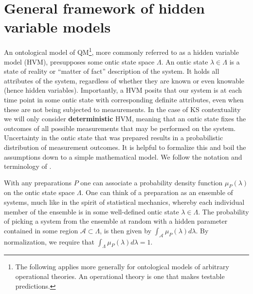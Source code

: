 \section{General framework of hidden variable models}
\label{sec:hvm}
An ontological model of QM\footnote{The following applies more generally for ontological models of arbitrary operational theories. An operational theory is one that makes testable predictions.}, more commonly referred to as a hidden variable model (HVM), presupposes some ontic state space $\Lambda$. An ontic state $\lambda\in\Lambda$ is a state of reality or “matter of fact” description of the system. It holds all attributes of the system, regardless of whether they are known or even knowable (hence hidden variables). Importantly, a HVM posits that our system is at each time point in some ontic state with corresponding definite attributes, even when these are not being subjected to measurements. In the case of KS contextuality we will only consider \textbf{deterministic} HVM, meaning that an ontic state fixes the outcomes of all possible measurements that may be performed on the system. Uncertainty in the ontic state that was prepared results in a probabilistic distribution of measurement outcomes. It is helpful to formalize this and boil the assumptions down to a simple mathematical model. We follow the notation and terminology of \cite{Spekkens2005}.

With any preparations $P$ one can associate a probability density function $\mu_{P}(\lambda)$ on the ontic state space $\Lambda$. One can think of a preparation as an ensemble of systems, much like in the spirit of statistical mechanics, whereby each individual member of the ensemble is in some well-defined ontic state $\lambda\in\Lambda$. The probability of picking a system from the ensemble at random with a hidden parameter contained in some region $\mathcal{A}\subset\Lambda$, is then given by $\int_{\mathcal{A}}\mu_{P}(\lambda)d\lambda$. By normalization, we require that $\int_{\Lambda}\mu_{P}(\lambda)d\lambda=1$.

